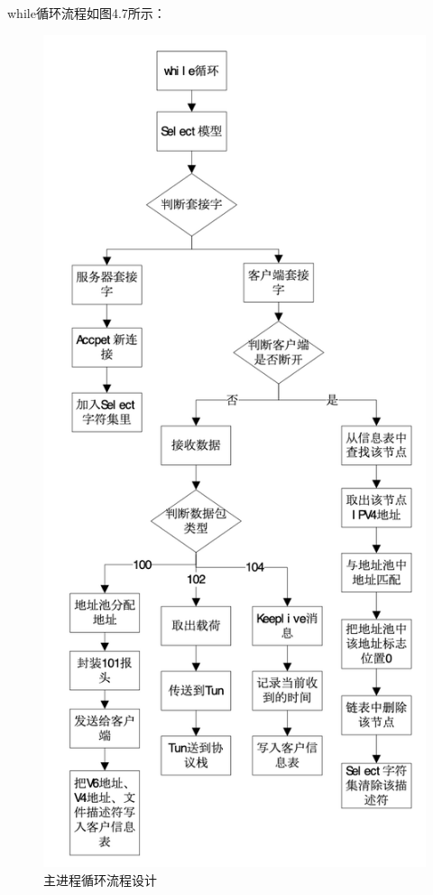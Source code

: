 while循环流程如图4.7所示：
\begin{figure}[!ht]
	\begin{center}
	\includegraphics[scale=.58]{server_main.png}
	\end{center}
	\caption{主进程循环流程设计}
	\label{figure:主进程循环流程设计}
\end{figure}

